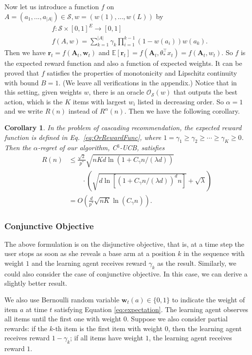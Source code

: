 \documentclass{article}
\newcommand{\EE}{\mathbb{E}}
\newcommand{\bA}{\mathbf{A}}
\newcommand{\br}{\mathbf{r}}
\newcommand{\bw}{\mathbf{w}}
\newcommand{\cO}{\mathcal{O}}
\newcommand{\cS}{\mathcal{S}}
\newcommand{\abs}[1]{\left| #1 \right|}
\newtheorem{corollary}[theorem]{Corollary}%
\begin{document}
Now let us introduce a function $f$ on $A = (a_1,...,a_{\abs{A}}) \in \cS, w = (w(1),...,w(L))$ by
\begin{align}
&f : \cS \times [0,1]^E \to [0,1] \nonumber \\
&f(A,w) = \sum_{k = 1}^{\abs{A}} \gamma_{k} \prod_{i=1}^{k-1} (1 - w(a_i)) w(a_k). \label{eq:OrRewardFunc}
\end{align}
Then we have $\br_t = f(\bA_t, \bw_t)$ and $\EE[\br_t] = f(\bA_t, \theta_{\ast}^{\top}x_t) = f(\bA_t, w_t)$. So $f$ is the expected reward function and also a function of expected weights. It can be proved that $f$ satisfies the properties of monotonicity and Lipschitz continuity with bound $B=1$. (We leave all verifications in the appendix.) Notice that in this setting, given weights $w$, there is an oracle $\cO_{\cS}(w)$ that outputs the best action, which is the $K$ items with largest $w_i$ listed in decreasing order. So $\alpha = 1$ and we write $R(n)$ instead of $R^{\alpha}(n)$. Then we have the following corollary.
\begin{corollary}
	\label{cor:or}
	In the problem of cascading recommendation, the expected reward function is defined in Eq.~\eqref{eq:OrRewardFunc}, where $1 = \gamma_1 \geq \gamma_2 \geq \cdots \geq \gamma_K \geq 0$. Then the $\alpha$-regret of our algorithm, C$^3$-UCB, satisfies
	\begin{align}
		R(n) &\le \frac{\sqrt{2}}{p^*} \sqrt{nKd\ln(1 + C_\gamma n/(\lambda d))}  \nonumber \\
		&\qquad \cdot \left(\sqrt{d\ln[(1 + C_\gamma n/(\lambda d))^d n]} + \sqrt{\lambda}\right) \nonumber \\
		&=O\left(\frac{d}{p^*} \sqrt{nK} \ln (C_\gamma n) \right).
	\end{align}
\end{corollary}

\subsubsection{Conjunctive Objective}
\label{sec:conj}

The above formulation is on the disjunctive objective, that is, at a time step the user stops as soon as she reveals a base arm at a position $k$ in the sequence with weight $1$ and the learning agent receives reward $\gamma_k$ as the result. Similarly, we could also consider the case of conjunctive objective. In this case, we can derive a slightly better result.

We also use Bernoulli random variable $\bw_{t}(a) \in \{0,1\}$ to indicate the weight of item $a$ at time $t$ satisfying Equation \eqref{eq:expectation}. The learning agent observes all items until the first one with weight $0$. Suppose we also consider partial rewards: if the $k$-th item is the first item with weight $0$, then the learning agent receives reward $1-\gamma_k$; if all items have weight $1$, the learning agent receives reward $1$. 
\end{document}
